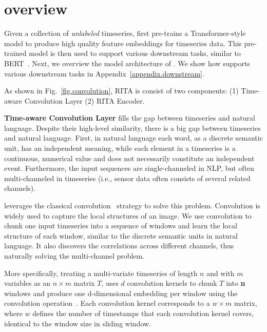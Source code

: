 \section{\system overview}
\label{sec.rita}
Given a collection of {\it unlabeled} timeseries, \system first pre-trains a Transformer-style model to produce high quality feature embeddings for timeseries data. This pre-trained model is then used to support various downstream tasks, similar to BERT~\cite{DBLP:conf/naacl/DevlinCLT19}. Next, we overview the model architecture of \system. We show how \system supports various downstream tasks in Appendix~\ref{appendix.downstream}. 

\begin{sloppypar}

As shown in Fig.~\ref{fig.convolution},
RITA is consist of two components: (1) Time-aware Convolution Layer (2) RITA Encoder.

\noindent\textbf{Time-aware Convolution Layer} fills the gap between timeseries and natural language. Despite their high-level similarity, there is a big gap between timeseries and natural language. 
First, in natural language each word, as a discrete semantic unit, has an independent meaning, while each element in a timeseries is a continuous, numerical value and does not necessarily constitute an independent event. 
Furthermore, the input sequences are single-channeled in NLP, but often multi-channeled in timeseries (i.e., sensor data often consists of several related channels).

\system leverages the classical convolution~\cite{NIPS2012_c399862d} strategy to solve this problem. Convolution is widely used to capture the local structures of an image. We use convolution to chunk one input timeseries into a sequence of windows and learn the local structure of each window, similar to the discrete semantic units in natural language. 
It also discovers the correlations across different channels, thus naturally solving the multi-channel problem. 

More specifically, treating a multi-variate timeseries of length $n$ and with $m$ variables as an $\mathit{n \times m}$ matrix $T$, \system uses $d$ convolution kernels to chunk $T$ into \textbf{n} windows and produce one d-dimensional embedding per window using the convolution operation~\cite{NIPS2012_c399862d}. Each convolution kernel corresponds to a $\mathit{w \times m}$ matrix, where $w$ defines the number of timestamps that each convolution kernel covers, identical to the window size in sliding window. 


\end{sloppypar}
